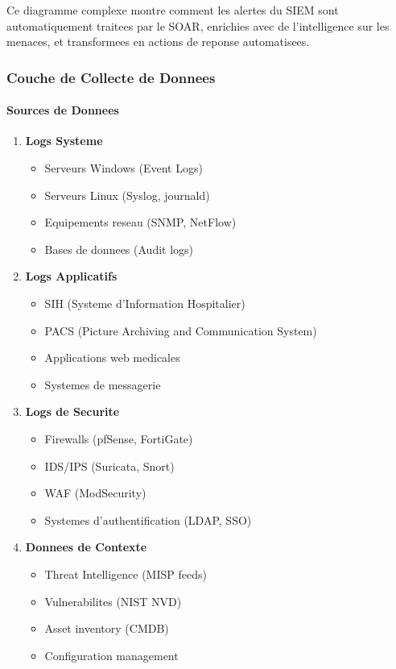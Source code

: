 Ce diagramme complexe montre comment les alertes du SIEM sont automatiquement traitees par le SOAR, enrichies avec de l'intelligence sur les menaces, et transformees en actions de reponse automatisees.

\subsubsection{Couche de Collecte de Donnees}

\paragraph{Sources de Donnees}
\begin{enumerate}
    \item \textbf{Logs Systeme}
          \begin{itemize}
              \item Serveurs Windows (Event Logs)
              \item Serveurs Linux (Syslog, journald)
              \item Equipements reseau (SNMP, NetFlow)
              \item Bases de donnees (Audit logs)
          \end{itemize}

    \item \textbf{Logs Applicatifs}
          \begin{itemize}
              \item SIH (Systeme d'Information Hospitalier)
              \item PACS (Picture Archiving and Communication System)
              \item Applications web medicales
              \item Systemes de messagerie
          \end{itemize}

    \item \textbf{Logs de Securite}
          \begin{itemize}
              \item Firewalls (pfSense, FortiGate)
              \item IDS/IPS (Suricata, Snort)
              \item WAF (ModSecurity)
              \item Systemes d'authentification (LDAP, SSO)
          \end{itemize}

    \item \textbf{Donnees de Contexte}
          \begin{itemize}
              \item Threat Intelligence (MISP feeds)
              \item Vulnerabilites (NIST NVD)
              \item Asset inventory (CMDB)
              \item Configuration management
          \end{itemize}
\end{enumerate}

